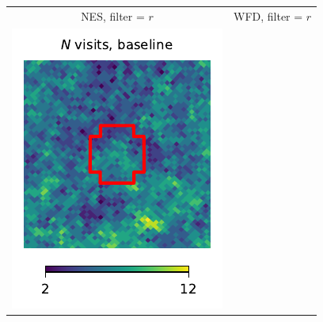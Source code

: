 \documentclass[preprintm,linenumbers]{aastex631}
\begin{document}
  
  	\begin{figure}
			\centering
            			\begin{tabular}{@{}c@{}c@{}}
                 NES, filter = $r$ & WFD, filter = $r$ \\
				\includegraphics{results/skymaps_cutout/skymaps_cutout_first_year_one_snap_v4_0_10yrs_db_noDD_noTwi_nside-256_CountMetric_r_NES_noDD_noTwi.pdf} &

\end{tabular}
\end{figure}
\end{document}
